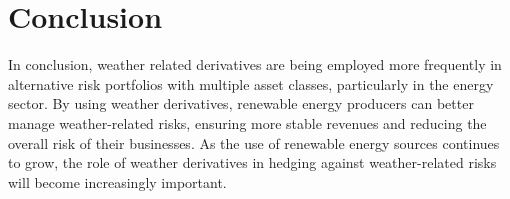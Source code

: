 %

\section{Conclusion}
\label{sec:weather_conclusion}

    In conclusion, weather related derivatives are being employed more frequently in alternative risk portfolios with
    multiple asset classes, particularly in the energy sector.
    By using weather derivatives, renewable energy producers can better manage weather-related risks,
    ensuring more stable revenues and reducing the overall risk of their businesses.
    As the use of renewable energy sources continues to grow,
    the role of weather derivatives in hedging against weather-related risks will become increasingly important.





